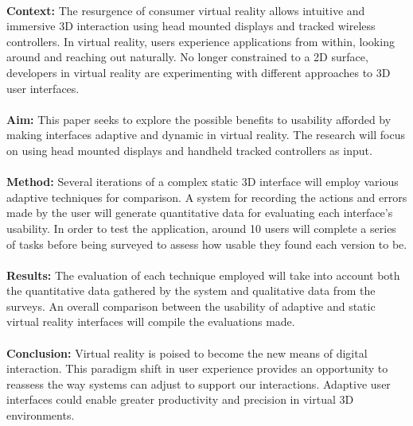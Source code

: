 \documentclass[11pt]{article}
\begin{document}
\paragraph{}
\textbf{Context:}
The resurgence of consumer virtual reality allows intuitive and immersive 3D interaction using head mounted displays and tracked wireless controllers. In virtual reality, users experience applications from within, looking around and reaching out naturally. No longer constrained to a 2D surface, developers in virtual reality are experimenting with different approaches to 3D user interfaces.
\paragraph{}
\textbf{Aim:}
This paper seeks to explore the possible benefits to usability afforded by making interfaces adaptive and dynamic in virtual reality. The research will focus on using head mounted displays and handheld tracked controllers as input.
\paragraph{}
\textbf{Method:}
Several iterations of a complex static 3D interface will employ various adaptive techniques for comparison. A system for recording the actions and errors made by the user will generate quantitative data for evaluating each interface's usability. In order to test the application, around 10 users will complete a series of tasks before being surveyed to assess how usable they found each version to be.
\paragraph{}
\textbf{Results:}
The evaluation of each technique employed will take into account both the quantitative data gathered by the system and qualitative data from the surveys. An overall comparison between the usability of adaptive and static virtual reality interfaces will compile the evaluations made.
\paragraph{}
\textbf{Conclusion:}
Virtual reality is poised to become the new means of digital interaction. This paradigm shift in user experience provides an opportunity to reassess the way systems can adjust to support our interactions. Adaptive user interfaces could enable greater productivity and precision in virtual 3D environments.
\end{document}
